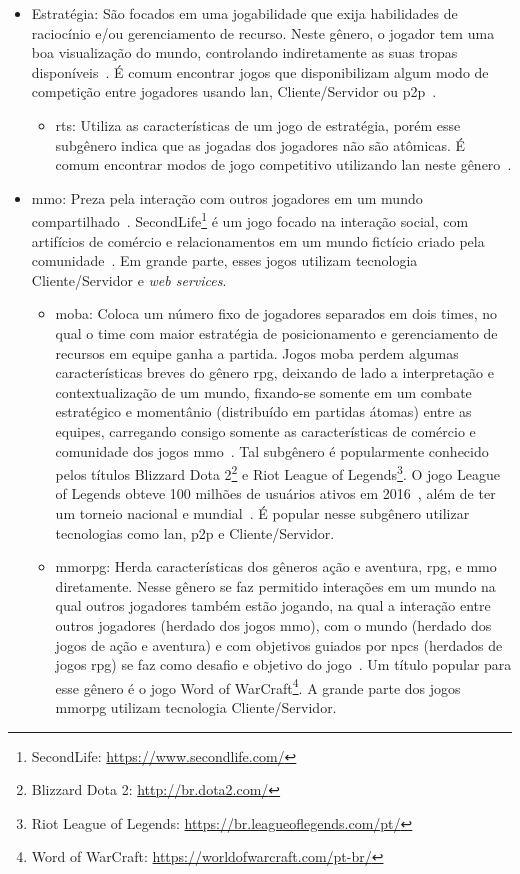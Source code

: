 \begin{itemize}
  \item Estratégia: São focados em uma jogabilidade que exija habilidades de raciocínio e/ou gerenciamento de recurso. Neste gênero, o jogador tem uma boa visualização do mundo, controlando indiretamente as suas tropas disponíveis~\cite{rollings2003andrew}. É comum encontrar jogos que disponibilizam algum modo de competição entre jogadores usando \ac{lan}, Cliente/Servidor ou \ac{p2p}~\cite{adams_1208533}.
    \begin{itemize}
      \item \ac{rts}: Utiliza as características de um jogo de estratégia, porém esse subgênero indica que as jogadas dos jogadores não são atômicas. É comum encontrar modos de jogo competitivo utilizando \ac{lan} neste gênero~\cite{adams_1208533}.
    \end{itemize}
  \item \ac{mmo}: Preza pela interação com outros jogadores em um mundo compartilhado~\cite{adams_1208533}. SecondLife\footnote{SecondLife: \url{https://www.secondlife.com/}} é um jogo focado na interação social, com artifícios de comércio e relacionamentos em um mundo fictício criado pela comunidade~\cite{tecmundo_secondlife}. Em grande parte, esses jogos utilizam tecnologia Cliente/Servidor e \textit{web services}.
    \begin{itemize}
      \item \ac{moba}: Coloca um número fixo de jogadores separados em dois times, no qual o time com maior estratégia de posicionamento e gerenciamento de recursos em equipe ganha a partida. Jogos \ac{moba} perdem algumas características breves do gênero \ac{rpg}, deixando de lado a interpretação e contextualização de um mundo, fixando-se somente em um combate estratégico e momentânio (distribuído em partidas átomas) entre as equipes, carregando consigo somente as características de comércio e comunidade dos jogos \ac{mmo}~\cite{adams_1208533}. Tal subgênero é popularmente conhecido pelos títulos Blizzard Dota 2\footnote{Blizzard Dota 2: \url{http://br.dota2.com/}} e Riot League of Legends\footnote{Riot League of Legends: \url{https://br.leagueoflegends.com/pt/}}. O jogo League of Legends obteve 100 milhões de usuários ativos em 2016~\cite{lol_statista}, além de ter um torneio nacional e mundial~\cite{lol_sportv}. É popular nesse subgênero utilizar tecnologias como \ac{lan}, \ac{p2p} e Cliente/Servidor.
      \item \ac{mmorpg}: Herda características dos gêneros ação e aventura, \ac{rpg}, e \ac{mmo} diretamente. Nesse gênero se faz permitido interações em um mundo na qual outros jogadores também estão jogando, na qual a interação entre outros jogadores (herdado dos jogos \ac{mmo}), com o mundo (herdado dos jogos de ação e aventura) e com objetivos guiados por \ac{npcs} (herdados de jogos \ac{rpg}) se faz como desafio e objetivo do jogo~\cite{adams_1208533}. Um título popular para esse gênero é o jogo Word of WarCraft\footnote{Word of WarCraft: \url{https://worldofwarcraft.com/pt-br/}}. A grande parte dos jogos \ac{mmorpg} utilizam tecnologia Cliente/Servidor.

\end{itemize}
\end{itemize}
